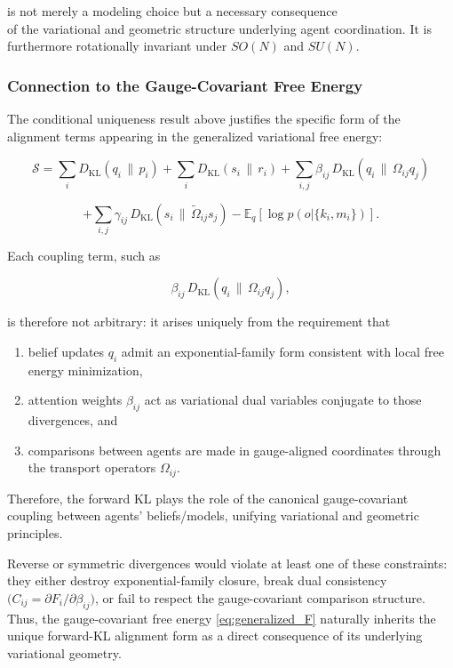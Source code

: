\documentclass[11pt]{article}
\begin{document}
is not merely a modeling choice but a necessary consequence\\
of the variational and geometric structure underlying agent coordination.  It is furthermore rotationally invariant under $SO(N)$ and $SU(N)$.

\subsubsection{Connection to the Gauge-Covariant Free Energy}
The conditional uniqueness result above justifies the specific form of the alignment terms appearing in the generalized variational free energy:

$$
\mathcal{S}
=\sum_i D_{\mathrm{KL}}(q_i \,\|\, p_i)
+ \sum_i D_{\mathrm{KL}}(s_i \,\|\, r_i)
+ \sum_{i,j}\beta_{ij}\,D_{\mathrm{KL}}(q_i \,\|\, \Omega_{ij} q_j) 
$$

$$
+ \sum_{i,j}\gamma_{ij}\,D_{\mathrm{KL}}(s_i \,\|\, \tilde{\Omega}_{ij}s_j)- \mathbb{E}_q[\log p(o|\{k_i,m_i\})].
$$

Each coupling term, such as

$$
\beta_{ij}\,D_{\mathrm{KL}}(q_i \,\|\, \Omega_{ij} q_j),
$$

is therefore not arbitrary: it arises uniquely from the requirement that

\begin{enumerate}
  \item belief updates $q_i$ admit an exponential-family form consistent with local free energy minimization,
  \item attention weights $\beta_{ij}$ act as variational dual variables conjugate to those divergences, and
  \item comparisons between agents are made in gauge-aligned coordinates through the transport operators $\Omega_{ij}$.
\end{enumerate}

Therefore, the forward KL plays the role of the canonical gauge-covariant coupling between agents' beliefs/models, unifying variational and geometric principles.

Reverse or symmetric divergences would violate at least one of these constraints: they either destroy exponential-family closure, break dual consistency $\big(C_{ij} = \partial F_i / \partial \beta_{ij}\big)$, or fail to respect the gauge-covariant comparison structure. Thus, the gauge-covariant free energy \eqref{eq:generalized_F} naturally inherits the unique forward-KL alignment form as a direct consequence of its underlying variational geometry.
\end{document}
